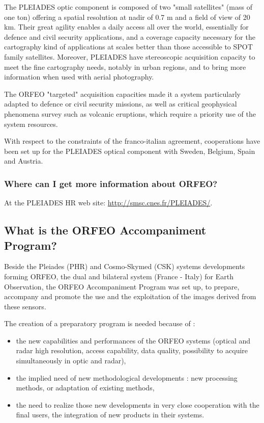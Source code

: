 The PLEIADES optic component is composed of two "small satellites"
(mass of one ton) offering a spatial resolution at nadir of 0.7 m and
a field of view of 20 km. Their great agility enables a daily access
all over the world, essentially for defence and civil security
applications, and a coverage capacity necessary for the cartography
kind of applications at scales better than those accessible to SPOT
family satellites. Moreover, PLEIADES have stereoscopic
acquisition capacity to meet the fine cartography needs, notably in
urban regions, and to bring more information when used with aerial
photography.

The ORFEO "targeted" acquisition capacities made it a system
particularly adapted to defence or civil security missions, as well as
critical geophysical phenomena survey such as volcanic eruptions,
which require a priority use of the system resources.

With respect to the constraints of the franco-italian agreement,
cooperations have been set up for the PLEIADES optical component with
Sweden, Belgium, Spain and Austria.

\subsubsection{Where can I get more information about ORFEO?}
At the PLEIADES HR web site: \url{http://smsc.cnes.fr/PLEIADES/}.

\subsection{What is the ORFEO Accompaniment Program?}
Beside the Pleiades (PHR) and Cosmo-Skymed (CSK) systems developments forming ORFEO, the dual and bilateral system (France - Italy) for Earth Observation, the ORFEO Accompaniment Program was set up, to prepare, accompany and promote the use and the exploitation of the images derived from these sensors.

The creation of a preparatory program is needed because of :
\begin{itemize}
  \item the new capabilities and performances of the ORFEO systems (optical and radar high resolution, access capability, data quality, possibility to acquire simultaneously in optic and radar),
  \item the implied need of new methodological developments : new processing methods, or adaptation of existing methods,
  \item the need to realize those new developments in very close cooperation with the final users, the integration of new products in their systems.
\end{itemize}


